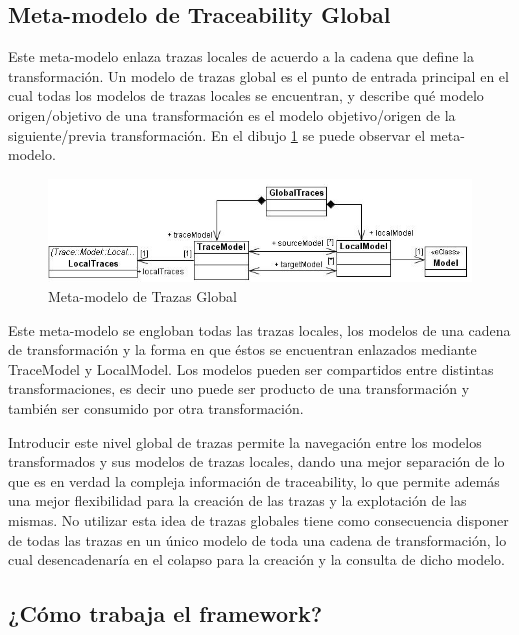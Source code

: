 \documentclass[a4paper,12pt,oneside]{book}
\begin{document}
\subsection{Meta-modelo de Traceability Global}

Este meta-modelo enlaza trazas locales de acuerdo a la cadena que define la transformación. Un modelo de trazas global es el punto de entrada principal en el cual todas los modelos de trazas locales se encuentran, y describe qué modelo origen/objetivo de una transformación es el modelo objetivo/origen de la siguiente/previa transformación. En el dibujo \ref{fig:GlobalTraceMetamodel} se puede observar el meta-modelo.

\begin{figure}[hbtp]
\centering
\includegraphics[scale=.6]{./img/GlobalTraceMetamodel}
\caption{Meta-modelo de Trazas Global}
\label{fig:GlobalTraceMetamodel}
\end{figure}

Este meta-modelo se engloban todas las trazas locales, los modelos de una cadena de transformación y la forma en que éstos se encuentran enlazados mediante TraceModel y LocalModel. Los modelos pueden ser compartidos entre distintas transformaciones, es decir uno puede ser producto de una transformación y también ser consumido por otra transformación.

Introducir este nivel global de trazas permite la navegación entre los modelos transformados y sus modelos de trazas locales, dando una mejor separación de lo que es en verdad la compleja información de traceability, lo que permite además una mejor flexibilidad para la creación de las trazas y la explotación de las mismas. No utilizar esta idea de trazas globales tiene como consecuencia disponer de todas las trazas en un único modelo de toda una cadena de transformación, lo cual desencadenaría en el colapso para la creación y la consulta de dicho modelo.

\subsection{¿Cómo trabaja el framework?}
\end{document}
